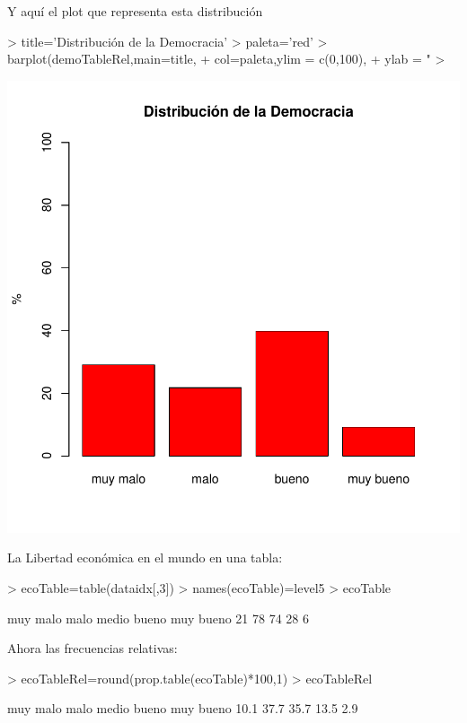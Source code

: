\documentclass{article}
\begin{document}
Y aquí el plot que representa esta distribución
\begin{Schunk}
\begin{Sinput}
> title='Distribución de la Democracia'
> paleta='red'
> barplot(demoTableRel,main=title,
+         col=paleta,ylim = c(0,100),
+         ylab = "%
> 
\end{Sinput}
\end{Schunk}
\includegraphics{paperVersion_0-demoTableRelPlot}


La Libertad económica en el mundo en una tabla:
\begin{Schunk}
\begin{Sinput}
> ecoTable=table(dataidx[,3])
> names(ecoTable)=level5
> ecoTable
\end{Sinput}
\begin{Soutput}
 muy malo      malo     medio     bueno muy bueno 
       21        78        74        28         6 
\end{Soutput}
\end{Schunk}


Ahora las frecuencias relativas:
\begin{Schunk}
\begin{Sinput}
> ecoTableRel=round(prop.table(ecoTable)*100,1)
> ecoTableRel
\end{Sinput}
\begin{Soutput}
 muy malo      malo     medio     bueno muy bueno 
     10.1      37.7      35.7      13.5       2.9 
\end{Soutput}
\end{Schunk}
\end{document}
